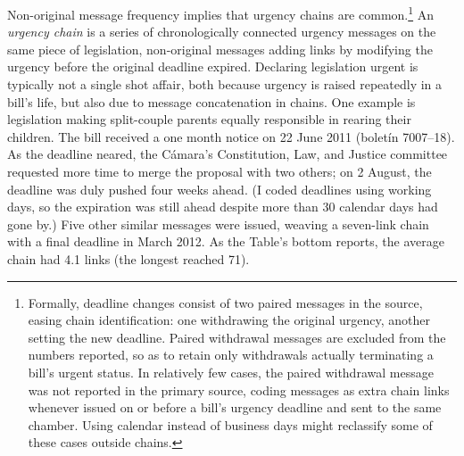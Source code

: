\documentclass[letter,12pt]{article}
\begin{document}
Non-original message frequency implies that urgency chains are common.\footnote{Formally, deadline changes consist of two paired messages in the source, easing chain identification: one withdrawing the original urgency, another setting the new deadline. Paired withdrawal messages are excluded from the numbers reported, so as to retain only withdrawals actually terminating a bill's urgent status. In relatively few cases, the paired withdrawal message was not reported in the primary source, coding messages as extra chain links whenever issued on or before a bill's urgency deadline and sent to the same chamber. Using calendar instead of business days might reclassify some of these cases outside chains.} An \emph{urgency chain} is a series of chronologically connected urgency messages on the same piece of legislation, non-original messages adding links by modifying the urgency before the original deadline expired. Declaring legislation urgent is typically not a single shot affair, both because urgency is raised repeatedly in a bill's life, but also due to message concatenation in chains. One example is legislation making split-couple parents equally responsible in rearing their children. The bill received a one month notice on 22 June 2011 (bolet\'in 7007--18). As the deadline neared, the C\'amara's Constitution, Law, and Justice committee requested more time to merge the proposal with two others; on 2 August, the deadline was duly pushed four weeks ahead. (I coded deadlines using working days, so the expiration was still ahead despite more than 30 calendar days had gone by.) Five other similar messages were issued, weaving a seven-link chain with a final deadline in March 2012. As the Table's bottom reports, the average chain had 4.1 links (the longest reached 71). 
\end{document}
